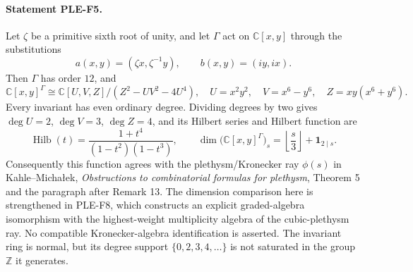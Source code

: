 \paragraph{Statement PLE-F5.}
Let $\zeta$ be a primitive sixth root of unity, and let $\Gamma$ act on
$\mathbb C[x,y]$ through the substitutions
\[
 a(x,y)=(\zeta x,\zeta^{-1}y),\qquad b(x,y)=(iy,ix).
\]
Then $\Gamma$ has order $12$, and
\[
 \mathbb C[x,y]^\Gamma\cong
 \mathbb C[U,V,Z]/(Z^2-UV^2-4U^4),
 \quad U=x^2y^2,\quad V=x^6-y^6,\quad Z=xy(x^6+y^6).
 \tag{PLE-F5a}
\]
Every invariant has even ordinary degree. Dividing degrees by two gives
$\deg U=2$, $\deg V=3$, $\deg Z=4$, and its Hilbert series and Hilbert
function are
\[
 \operatorname{Hilb}(t)=\frac{1+t^4}{(1-t^2)(1-t^3)},\qquad
 \dim\bigl(\mathbb C[x,y]^\Gamma\bigr)_s
      =\left\lfloor\frac{s}{3}\right\rfloor+\mathbf1_{2\mid s}.
 \tag{PLE-F5b}
\]
Consequently this function agrees with the plethysm/Kronecker ray
$\phi(s)$ in Kahle--Micha\l ek, \emph{Obstructions to combinatorial formulas
for plethysm}, Theorem 5 and the paragraph after Remark 13.
The dimension comparison here is strengthened in PLE-F8, which
constructs an explicit graded-algebra isomorphism with the
highest-weight multiplicity algebra of the cubic-plethysm ray.
No compatible Kronecker-algebra identification is asserted.
The invariant ring is normal, but its degree support
$\{0,2,3,4,\ldots\}$ is not saturated in the group $\mathbb Z$ it generates.

